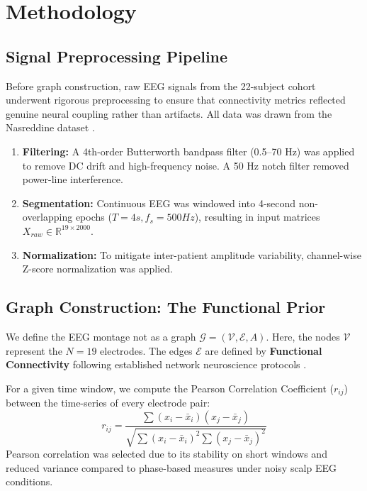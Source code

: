 \documentclass[journal]{IEEEtran}
\begin{document}
\section{Methodology}

\subsection{Signal Preprocessing Pipeline}
Before graph construction, raw EEG signals from the 22-subject cohort underwent rigorous preprocessing to ensure that connectivity metrics reflected genuine neural coupling rather than artifacts. All data was drawn from the Nasreddine dataset \cite{nasreddine}.
\begin{enumerate}
    \item \textbf{Filtering:} A 4th-order Butterworth bandpass filter (0.5--70 Hz) was applied to remove DC drift and high-frequency noise. A 50 Hz notch filter removed power-line interference.
    \item \textbf{Segmentation:} Continuous EEG was windowed into 4-second non-overlapping epochs ($T=4s, f_s=500Hz$), resulting in input matrices $X_{raw} \in \mathbb{R}^{19 \times 2000}$.
    \item \textbf{Normalization:} To mitigate inter-patient amplitude variability, channel-wise Z-score normalization was applied.
\end{enumerate}

\subsection{Graph Construction: The Functional Prior}
We define the EEG montage not as a graph $\mathcal{G} = (\mathcal{V}, \mathcal{E}, A)$. Here, the nodes $\mathcal{V}$ represent the $N=19$ electrodes. The edges $\mathcal{E}$ are defined by \textbf{Functional Connectivity} following established network neuroscience protocols \cite{bassett, bartolomei}.

For a given time window, we compute the Pearson Correlation Coefficient ($r_{ij}$) between the time-series of every electrode pair:
\begin{equation}
r_{ij} = \frac{\sum (x_i - \bar{x}_i)(x_j - \bar{x}_j)}{\sqrt{\sum (x_i - \bar{x}_i)^2 \sum (x_j - \bar{x}_j)^2}}
\end{equation}
Pearson correlation was selected due to its stability on short windows and reduced variance compared to phase-based measures under noisy scalp EEG conditions.
\end{document}
